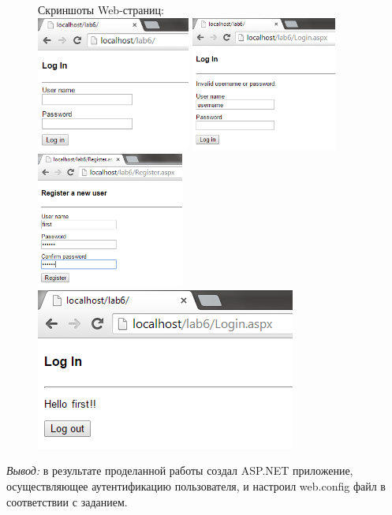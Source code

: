 \documentclass[pscyr]{hedlab}
\begin{document}
    \begin{figure}[h!]
        \center
        Скриншоты Web-страниц:\\
        \includegraphics[height=12em]{01} \hspace{.5em}
        \includegraphics[height=12em]{03} \hspace{.5em}
        \includegraphics[height=12em]{04} \\
        \includegraphics{02}
    \end{figure}

    \emph{Вывод:} в результате проделанной работы создал ASP.NET приложение,
      осуществляющее аутентификацию пользователя, и настроил web.config файл
      в соответствии с заданием.
\end{document}
